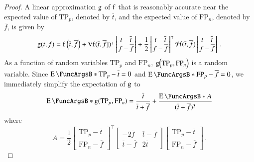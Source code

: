 \documentclass[10pt,final,hidelinks]{article}
\numberwithin{equation}{section}
\newcommand{\TP}{\RV{TP}}
\newcommand{\FP}{\RV{FP}}
\newcommand{\RV}[1]{\mathrm{#1}}
\theoremstyle{plain}
\begin{document}
{\begin{proof}
A linear approximation $\Fun{g}$ of $\Fun{f}$ that is reasonably accurate near the expected value of $\TP_p$, denoted by $\overline{t}$, and the expected value of $\FP_n$, denoted by $\overline{f}$, is given by
\begin{equation}
    \Fun{g}(t,f) =
    \Fun{f}\left(\overline{t},\overline{f}\right) + \nabla{\Fun{f}}(\overline{t},\overline{f}])^{\intercal}
    \begin{bmatrix}
        t - \overline{t}\\
        f - \overline{f}\\
    \end{bmatrix}
    + \frac{1}{2}
    \begin{bmatrix}
        t - \overline{t}\\
        f - \overline{f}\\
    \end{bmatrix}^{\intercal}
    \mathcal{H}(\overline{t},\overline{f})
    \begin{bmatrix}
        t - \overline{t}\\
        f - \overline{f}\\
    \end{bmatrix}\,.
\end{equation}
As a function of random variables $\TP_p$ and $\FP_n$, $\Fun{g}\!\left(\TP_p,\FP_n\right)$ is a random variable.
Since $\Expect{\TP_p - \overline{t}} = 0$ and $\Expect{\FP_p - \overline{f}} = 0$, we immediately simplify the expectation of $\Fun{g}$ to
\begin{equation}
\label{eq:proof_hess1}
    \Expect{\Fun{g}(\TP_p,\FP_n)} = \frac{\overline{t}}{\overline{t}+\overline{f}} + \frac{\Expect{A}}{(\overline{t} + \overline{f})^3}
\end{equation}
where
\begin{equation}
    A = \frac{1}{2}
    \begin{bmatrix}
        \TP_p - \overline{t}\\
        \FP_n - \overline{f}
    \end{bmatrix}^{\intercal}
    \begin{bmatrix}
        -2 \overline{f} & \overline{t}-\overline{f}\\
        \overline{t}-\overline{f} & 2 \overline{t}
    \end{bmatrix}
    \begin{bmatrix}
        \TP_p - \overline{t}\\
        \FP_n - \overline{f}
    \end{bmatrix}\,.

\end{equation}
\end{proof}}
\end{document}
